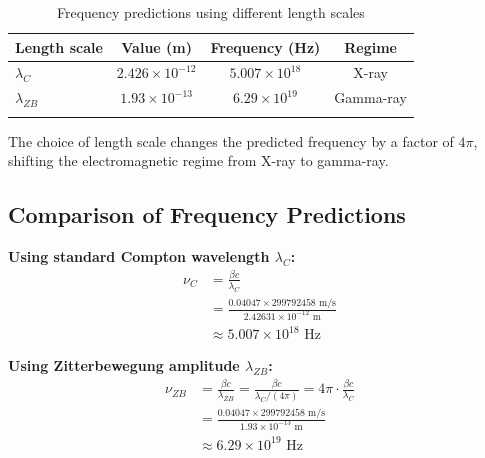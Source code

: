 \documentclass[%
 reprint,
 amsmath,amssymb,
 aps,
 prb,
]{revtex4-2}
\numberwithin{equation}{section}
\begin{document}
\begin{table}[t!]
\caption{Frequency predictions using different length scales}
\label{tab:frequency_scale_comparison}
\centering
\begin{tabular}{lccc}
\toprule
\textbf{Length scale} & \textbf{Value (m)} & \textbf{Frequency (Hz)} & \textbf{Regime} \\
\midrule
\addlinespace[0.25cm]
$\lambda_C$ & $2.426 \times 10^{-12}$ & $5.007 \times 10^{18}$ & X-ray \\
\addlinespace[0.25cm]
$\lambda_{ZB}$ & $1.93 \times 10^{-13}$ & $6.29 \times 10^{19}$ & Gamma-ray \\
\addlinespace[0.25cm]
\midrule
\multicolumn{4}{l}{Ratio: $\nu_{ZB}/\nu_C = 4\pi \approx 12.57$} \\
\bottomrule
\end{tabular}
\par\vspace{0.3em}
\begin{minipage}{\columnwidth}
\justifying\small
The choice of length scale changes the predicted frequency by a factor of $4\pi$, shifting the electromagnetic regime from X-ray to gamma-ray.
\end{minipage}
\end{table}

\subsection{Comparison of Frequency Predictions}

\noindent\textbf{Using standard Compton wavelength $\lambda_C$:}
\begin{equation}
\begin{split}
\nu_C &= \frac{\beta c}{\lambda_C} \\
      &= \frac{0.04047 \times 299792458 \text{ m/s}}{2.42631 \times 10^{-12} \text{ m}} \\
      &\approx 5.007 \times 10^{18} \text{ Hz}
\end{split}
\end{equation}

\noindent\textbf{Using Zitterbewegung amplitude $\lambda_{ZB}$:}
\begin{equation}
\begin{split}
\nu_{ZB} &= \frac{\beta c}{\lambda_{ZB}} = \frac{\beta c}{\lambda_C/(4\pi)} = 4\pi \cdot \frac{\beta c}{\lambda_C} \\
         &= \frac{0.04047 \times 299792458 \text{ m/s}}{1.93 \times 10^{-13} \text{ m}} \\
         &\approx 6.29 \times 10^{19} \text{ Hz}
\end{split}
\end{equation}
\end{document}
